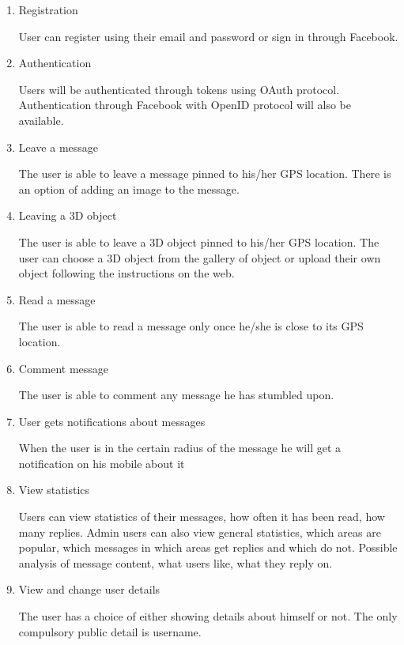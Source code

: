 \documentclass[thesis=M,english]{FITthesis}[2012/10/20]
\begin{document}
\begin{enumerate}
\item{Registration}

User can register using their email and password or sign in through Facebook.

\item{Authentication}

Users will be authenticated through tokens using OAuth protocol. Authentication through Facebook with OpenID protocol will also be available.

\item{Leave a message}

The user is able to leave a message pinned to his/her GPS location. There is an option of adding an image to the message.

\item{Leaving a 3D object}

The user is able to leave a 3D object pinned to his/her GPS location. The user can choose a 3D object from the gallery of object or upload their own object following the instructions on the web.

\item{Read a message}

The user is able to read a message only once he/she is close to its GPS location.

\item{Comment message}

The user is able to comment any message he has stumbled upon.

\item{User gets notifications about messages}

When the user is in the certain radius of the message he will get a notification on his mobile about it

\item{View statistics}

Users can view statistics of their messages, how often it has been read, how many replies.
Admin users can also view general statistics, which areas are popular, which messages in which areas get replies and which do not. Possible analysis of message content, what users like, what they reply on.

\item{View and change user details}

The user has a choice of either showing details about himself or not. The only compulsory public detail is username.

\end{enumerate}
\end{document}
